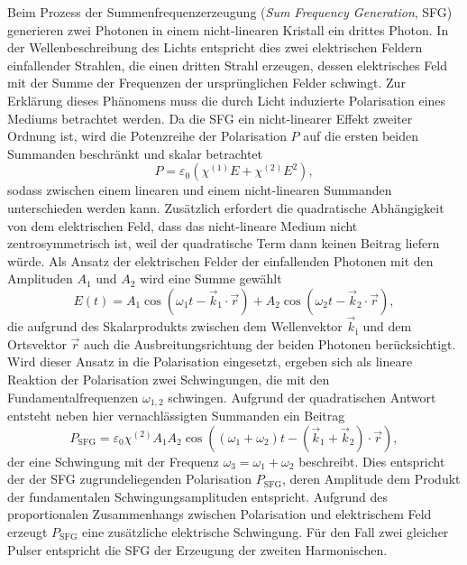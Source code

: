         Beim Prozess der Summenfrequenzerzeugung (\textit{Sum Frequency Generation}, SFG) generieren zwei Photonen in einem nicht-linearen Kristall ein drittes Photon. In der Wellenbeschreibung des Lichts 
        entspricht dies zwei elektrischen Feldern einfallender Strahlen, die einen dritten Strahl erzeugen, dessen elektrisches Feld mit der Summe der Frequenzen der ursprünglichen Felder schwingt. Zur 
        Erklärung dieses Phänomens muss die durch Licht induzierte Polarisation eines Mediums betrachtet werden. Da die SFG ein nicht-linearer Effekt zweiter Ordnung ist, wird die Potenzreihe der Polarisation 
        $P$ auf die ersten beiden Summanden beschränkt und skalar betrachtet
        \begin{equation*}
            P = \varepsilon_0 \left( \chi^{\left( 1 \right)}  E + \chi^{\left( 2 \right)}  E^2 \right) ,
        \end{equation*}
        sodass zwischen einem linearen und einem nicht-linearen Summanden unterschieden werden kann. Zusätzlich erfordert die quadratische Abhängigkeit von dem elektrischen Feld, dass das nicht-lineare Medium 
        nicht zentrosymmetrisch ist, weil der quadratische Term dann keinen Beitrag liefern würde. Als Ansatz der elektrischen Felder der einfallenden Photonen mit den Amplituden $A_1$ und $A_2$ wird eine 
        Summe gewählt
        \begin{equation*}
            E(t) = A_1  \cos\left(\omega_1 t - \vec{k}_1 \cdot \vec{r}\right) + A_2  \cos\left(\omega_2 t - \vec{k}_2 \cdot \vec{r}\right),
        \end{equation*}
        die aufgrund des Skalarprodukts zwischen dem Wellenvektor $\vec{k}_{\text{i}}$ und dem Ortsvektor $\vec{r}$ auch die Ausbreitungsrichtung der beiden Photonen berücksichtigt. Wird dieser Ansatz in die 
        Polarisation eingesetzt, ergeben sich als lineare Reaktion der Polarisation zwei Schwingungen, die mit den Fundamentalfrequenzen $\omega_{1,2}$ schwingen. Aufgrund der quadratischen Antwort entsteht 
        neben hier vernachlässigten Summanden ein Beitrag 
        \begin{equation*}
            P_{\text{SFG}} = \varepsilon_0  \chi^{(2)}  A_1 A_2  \cos\left( \left(\omega_1 + \omega_2\right) t - \left( \vec{k}_1 + \vec{k}_2 \right) \cdot \vec{r} \right) ,
        \end{equation*}
        der eine Schwingung mit der Frequenz $\omega_3 = \omega_1 + \omega_2$ beschreibt. Dies entspricht der der SFG zugrundeliegenden Polarisation 
        $P_{\text{SFG}}$, deren Amplitude dem Produkt der fundamentalen Schwingungsamplituden entspricht. Aufgrund des proportionalen Zusammenhangs zwischen Polarisation und elektrischem Feld erzeugt 
        $P_{\text{SFG}}$ eine zusätzliche elektrische Schwingung. Für den Fall zwei gleicher Pulser entspricht die SFG der Erzeugung der zweiten Harmonischen.

